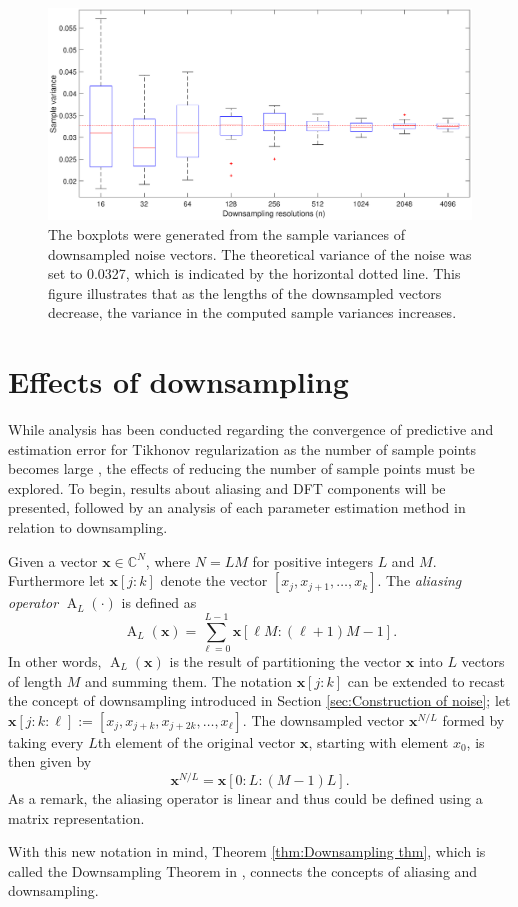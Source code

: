 \documentclass[12pt]{article}
\DeclareMathOperator{\alias}{A}	%
\begin{document}
\begin{figure}[htb]
\centerline{\includegraphics[scale=0.45]{Figures/VarPlot1D_F1_S05_W100_R20.eps}}
\caption{The boxplots were generated from the sample variances of downsampled noise vectors. The theoretical variance of the noise was set to 0.0327, which is indicated by the horizontal dotted line. This figure illustrates that as the lengths of the downsampled vectors decrease, the variance in the computed sample variances increases.}
\label{VarPlot1D}
\end{figure}

\section{Effects of downsampling} \label{sec:Effects of downsampling}
While analysis has been conducted regarding the convergence of predictive and estimation error for Tikhonov regularization as the number of sample points becomes large \cite{Vogel:2002}, the effects of reducing the number of sample points must be explored. To begin, results about aliasing and DFT components will be presented, followed by an analysis of each parameter estimation method in relation to downsampling. \par 
Given a vector $\mathbf{x} \in \mathbb{C}^N$, where $N = LM$ for positive integers $L$ and $M$. Furthermore let $\mathbf{x}[j:k]$ denote the vector $[x_j, x_{j+1},\ldots,x_k]$. The \textit{aliasing operator} $\alias_L(\cdot)$ is defined as
\[\alias_L(\mathbf{x}) = \sum_{\ell=0}^{L-1} \mathbf{x}[\ell{M}:(\ell+1)M-1].\]
In other words, $\alias_L(\mathbf{x})$ is the result of partitioning the vector $\mathbf{x}$ into $L$ vectors of length $M$ and summing them. The notation $\mathbf{x}[j:k]$ can be extended to recast the concept of downsampling introduced in Section \ref{sec:Construction of noise}; let $\mathbf{x}[j:k:\ell] := [x_{j},x_{j+k},x_{j+2k},\ldots,x_\ell]$. The downsampled vector $\mathbf{x}^{N/L}$ formed by taking every $L$th element of the original vector $\mathbf{x}$, starting with element $x_0$, is then given by
\[\mathbf{x}^{N/L} = \mathbf{x}[0:L:(M-1)L].\]
As a remark, the aliasing operator is linear and thus could be defined using a matrix representation. \par 
With this new notation in mind, Theorem \ref{thm:Downsampling thm}, which is called the Downsampling Theorem in \cite{AudioDFT}, connects the concepts of aliasing and downsampling.
\end{document}
